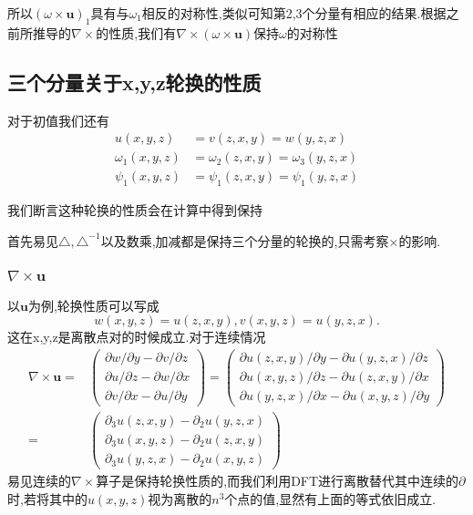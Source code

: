 \documentclass[UTF8]{ctexart}
\begin{document}
所以$(\omega\times \mathbf{u})_1$具有与$\omega_1$相反的对称性,类似可知第2,3个分量有相应的结果.根据之前所推导的$\nabla\times$的性质,我们有$\nabla\times(\omega\times \mathbf{u})$保持$\omega$的对称性

\subsection{三个分量关于x,y,z轮换的性质}
对于初值我们还有
\begin{equation*}
  \begin{split}
     u(x,y,z) & =v(z,x,y) = w(y,z,x) \\
       \omega_1(x,y,z) & =\omega_2(z,x,y) = \omega_3(y,z,x) \\
       \psi_1(x,y,z) & =\psi_1(z,x,y) = \psi_1(y,z,x)
  \end{split}
\end{equation*}

我们断言这种轮换的性质会在计算中得到保持

首先易见$\triangle,\triangle^{-1}$以及数乘,加减都是保持三个分量的轮换的,只需考察$\times$的影响.
\subsubsection{$\nabla \times \mathbf{u}$}
以$\mathbf{u}$为例,轮换性质可以写成
$$
w(x,y,z) = u(z,x,y),v(x,y,z)=u(y,z,x).
$$
这在x,y,z是离散点对的时候成立.对于连续情况
\begin{equation*}
\begin{split}
  \nabla \times \mathbf{u} = &
  \left(\begin{matrix}
    \partial w /\partial y - \partial v / \partial z \\
    \partial u /\partial z - \partial w / \partial x \\
    \partial v /\partial x - \partial u / \partial y
  \end{matrix}\right)=
  \left(\begin{matrix}
    \partial u(z,x,y) /\partial y - \partial u(y,z,x) / \partial z \\
    \partial u(x,y,z) /\partial z - \partial u(z,x,y) / \partial x \\
    \partial u(y,z,x) /\partial x - \partial u(x,y,z) / \partial y
  \end{matrix}\right) \\ =&
  \left(\begin{matrix}
    \partial_3 u(z,x,y) - \partial_2 u(y,z,x) \\
    \partial_3 u(x,y,z) - \partial_2 u(z,x,y) \\
    \partial_3 u(y,z,x) - \partial_2 u(x,y,z)
  \end{matrix}\right)
  \end{split}
\end{equation*}
易见连续的$\nabla \times$算子是保持轮换性质的,而我们利用DFT进行离散替代其中连续的$\partial$时,若将其中的$u(x,y,z)$视为离散的$n^3$个点的值,显然有上面的等式依旧成立.
\end{document}
